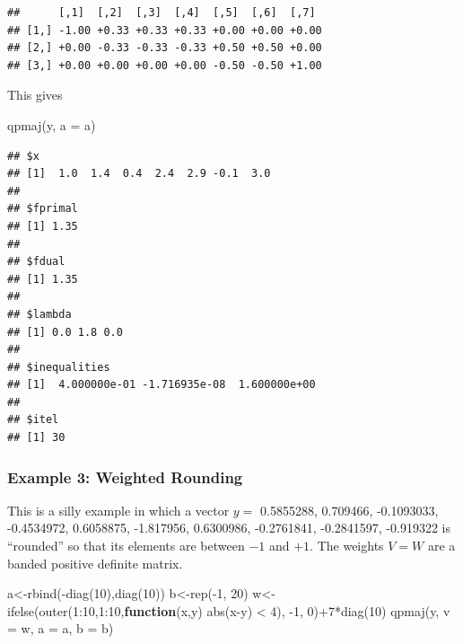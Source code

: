 \documentclass[
  12pt,
]{book}
\newenvironment{Shaded}{\begin{snugshade}}{\end{snugshade}}
\newcommand{\AttributeTok}[1]{\textcolor[rgb]{0.77,0.63,0.00}{#1}}
\newcommand{\ControlFlowTok}[1]{\textcolor[rgb]{0.13,0.29,0.53}{\textbf{#1}}}
\newcommand{\DecValTok}[1]{\textcolor[rgb]{0.00,0.00,0.81}{#1}}
\newcommand{\FunctionTok}[1]{\textcolor[rgb]{0.00,0.00,0.00}{#1}}
\newcommand{\NormalTok}[1]{#1}
\newcommand{\OtherTok}[1]{\textcolor[rgb]{0.56,0.35,0.01}{#1}}
\newcommand{\SpecialCharTok}[1]{\textcolor[rgb]{0.00,0.00,0.00}{#1}}
\theoremstyle{definition}
\theoremstyle{definition}
\theoremstyle{definition}
\theoremstyle{definition}
\theoremstyle{remark}
\begin{document}
\begin{verbatim}
##      [,1]  [,2]  [,3]  [,4]  [,5]  [,6]  [,7] 
## [1,] -1.00 +0.33 +0.33 +0.33 +0.00 +0.00 +0.00
## [2,] +0.00 -0.33 -0.33 -0.33 +0.50 +0.50 +0.00
## [3,] +0.00 +0.00 +0.00 +0.00 -0.50 -0.50 +1.00
\end{verbatim}

This gives

\begin{Shaded}
\begin{Highlighting}[]
\FunctionTok{qpmaj}\NormalTok{(y, }\AttributeTok{a =}\NormalTok{ a)}
\end{Highlighting}
\end{Shaded}

\begin{verbatim}
## $x
## [1]  1.0  1.4  0.4  2.4  2.9 -0.1  3.0
## 
## $fprimal
## [1] 1.35
## 
## $fdual
## [1] 1.35
## 
## $lambda
## [1] 0.0 1.8 0.0
## 
## $inequalities
## [1]  4.000000e-01 -1.716935e-08  1.600000e+00
## 
## $itel
## [1] 30
\end{verbatim}

\hypertarget{example-3-weighted-rounding}{%
\subsubsection{Example 3: Weighted Rounding}\label{example-3-weighted-rounding}}

This is a silly example in which a vector \(y=\) 0.5855288, 0.709466, -0.1093033, -0.4534972, 0.6058875, -1.817956, 0.6300986, -0.2761841, -0.2841597, -0.919322 is ``rounded'' so that its elements are between \(-1\) and \(+1\). The weights \(V=W\) are a banded positive definite matrix.

\begin{Shaded}
\begin{Highlighting}[]
\NormalTok{a}\OtherTok{\textless{}{-}}\FunctionTok{rbind}\NormalTok{(}\SpecialCharTok{{-}}\FunctionTok{diag}\NormalTok{(}\DecValTok{10}\NormalTok{),}\FunctionTok{diag}\NormalTok{(}\DecValTok{10}\NormalTok{))}
\NormalTok{b}\OtherTok{\textless{}{-}}\FunctionTok{rep}\NormalTok{(}\SpecialCharTok{{-}}\DecValTok{1}\NormalTok{, }\DecValTok{20}\NormalTok{)}
\NormalTok{w}\OtherTok{\textless{}{-}}\FunctionTok{ifelse}\NormalTok{(}\FunctionTok{outer}\NormalTok{(}\DecValTok{1}\SpecialCharTok{:}\DecValTok{10}\NormalTok{,}\DecValTok{1}\SpecialCharTok{:}\DecValTok{10}\NormalTok{,}\ControlFlowTok{function}\NormalTok{(x,y) }\FunctionTok{abs}\NormalTok{(x}\SpecialCharTok{{-}}\NormalTok{y) }\SpecialCharTok{\textless{}} \DecValTok{4}\NormalTok{), }\SpecialCharTok{{-}}\DecValTok{1}\NormalTok{, }\DecValTok{0}\NormalTok{)}\SpecialCharTok{+}\DecValTok{7}\SpecialCharTok{*}\FunctionTok{diag}\NormalTok{(}\DecValTok{10}\NormalTok{)}
\FunctionTok{qpmaj}\NormalTok{(y, }\AttributeTok{v =}\NormalTok{ w, }\AttributeTok{a =}\NormalTok{ a, }\AttributeTok{b =}\NormalTok{ b)}
\end{Highlighting}
\end{Shaded}
\end{document}
